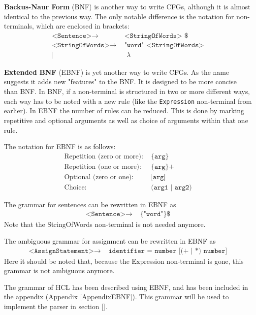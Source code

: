 \textbf{Backus-Naur Form} (BNF) is another way to write CFGs, although it is almost identical to the previous way.
The only notable difference is the notation for non-terminals, which are enclosed in brackets:
\begin{align*}
	\texttt{<Sentence>}\to & \texttt{ <StringOfWords> \$}\\
	\texttt{<StringOfWords>}\to & \texttt{ "word" <StringOfWords>}\\
	| & \texttt{ }\lambda
\end{align*}

\textbf{Extended BNF} (EBNF) is yet another way to write CFGs.
As the name suggests it adds new "features" to the BNF.
It is designed to be more concise than BNF.
In BNF, if a non-terminal is structured in two or more different ways, each way has to be noted with a new rule (like the \texttt{Expression} non-terminal from earlier).
In EBNF the number of rules can be reduced.
This is done by marking repetitive and optional arguments as well as choice of arguments within that one rule.
\cite{SebestaEBNF}

The notation for EBNF is as follows:
\begin{align*}
	\text{Repetition (zero or more):} & \texttt{ \{arg\}}\\
	\text{Repetition (one or more):} & \texttt{ \{arg\}+}\\
	\text{Optional (zero or one):} & \texttt{ [arg]}\\
	\text{Choice:} & \texttt{ (arg1 | arg2)}
\end{align*}

The grammar for sentences can be rewritten in EBNF as
\begin{align*}
	\texttt{<Sentence>}\to & \texttt{ \{"word"\} \$}
\end{align*}
Note that the StringOfWords non-terminal is not needed anymore.

The ambiguous grammar for assignment can be rewritten in EBNF as
\begin{align*}
	\texttt{<AssignStatement>}\to & \texttt{ identifier = number [(+ | *) number]}
\end{align*}
Here it should be noted that, because the Expression non-terminal is gone, this grammar is not ambiguous anymore.

The grammar of HCL has been described using EBNF, and has been included in the appendix (Appendix \ref{AppendixEBNF}).
This grammar will be used to implement the parser in section \ref{}.
